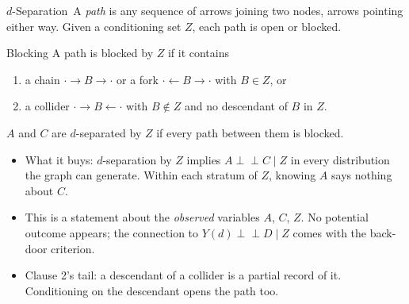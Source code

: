\documentclass[aspectratio=169,11pt,xcolor=dvipsnames]{beamer}
\newcommand{\indep}{\perp\!\!\!\perp}
\newcommand{\core}{\,\raisebox{0.6pt}{\textcolor{corestar}{$\bigstar$}}}
\begin{document}
\begin{frame}{$d$-Separation\core}
A \emph{path} is any sequence of arrows joining two nodes, arrows pointing
either way. Given a conditioning set $Z$, each path is open or blocked.
\begin{block}{Blocking}
A path is \alert{blocked} by $Z$ if it contains
\begin{enumerate}\itemsep1pt
  \item a chain $\cdot \to B \to \cdot$ or a fork $\cdot \leftarrow B \to \cdot$
        with $B \in Z$, or
  \item a collider $\cdot \to B \leftarrow \cdot$ with $B \notin Z$ and no
        descendant of $B$ in $Z$.
\end{enumerate}
$A$ and $C$ are \alert{$d$-separated} by $Z$ if every path between them is
blocked.
\end{block}
\vskip2pt
\begin{itemize}\itemsep2pt
  \item What it buys: $d$-separation by $Z$ implies $A \indep C \mid Z$ in
        every distribution the graph can generate. Within each stratum of
        $Z$, knowing $A$ says nothing about $C$.
  \item This is a statement about the \emph{observed} variables $A$, $C$,
        $Z$. No potential outcome appears; the connection to
        $Y(d) \indep D \mid Z$ comes with the back-door criterion.
  \item Clause 2's tail: a descendant of a collider is a partial record of
        it. Conditioning on the descendant opens the path too.
\end{itemize}
\end{frame}
\end{document}
